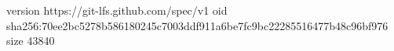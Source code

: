 version https://git-lfs.github.com/spec/v1
oid sha256:70ee2bc5278b586180245c7003ddf911a6be7fc9bc22285516477b48c96bf976
size 43840
